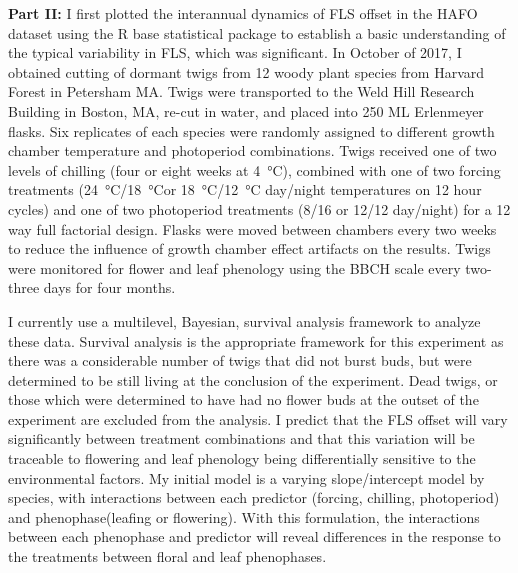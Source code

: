 \documentclass[12pt]{article}\usepackage[]{graphicx}\usepackage[]{color}
\begin{document}
\indent\textbf{Part II:} I first plotted the interannual dynamics of FLS offset in the HAFO dataset using the R base statistical package to establish a basic understanding of the typical variability in FLS, which was significant. In October of 2017, I obtained cutting of dormant twigs from 12 woody plant species from Harvard Forest in Petersham MA. Twigs were transported to the Weld Hill Research Building in Boston, MA, re-cut in water, and placed into 250 ML Erlenmeyer flasks. Six replicates of each species were randomly assigned to different growth chamber temperature and photoperiod combinations. Twigs received one of two levels of chilling (four or eight weeks at \SI{4}{\degreeCelsius}), combined with one of two forcing treatments (\SI{24}{\degreeCelsius}/\SI{18}{\degreeCelsius}or \SI{18}{\degreeCelsius}/\SI{12}{\degreeCelsius} day/night temperatures on 12 hour cycles) and one of two photoperiod treatments (8/16 or 12/12 day/night) for a 12 way full factorial design. Flasks were moved between chambers every two weeks to reduce the influence of growth chamber effect artifacts on the results. Twigs were monitored for flower and leaf phenology using the BBCH scale \citep{Finn2007} every two-three days for four months.
\par I currently  use a multilevel, Bayesian, survival analysis framework to analyze these data. Survival analysis is the appropriate framework for this experiment as there was a considerable number of twigs that did not burst buds, but were determined to be still living at the conclusion of the experiment. Dead twigs, or those which were determined to have had no flower buds at the outset of the experiment are excluded from the analysis. I predict that the FLS offset will vary significantly between treatment combinations and that this variation will be traceable to flowering and leaf phenology being differentially sensitive to the environmental factors. My initial model is a varying slope/intercept model by species, with interactions between each predictor (forcing, chilling, photoperiod) and phenophase(leafing or flowering). With this formulation, the interactions between each phenophase and predictor will reveal differences in the response to the treatments between floral and leaf phenophases.
\end{document}
